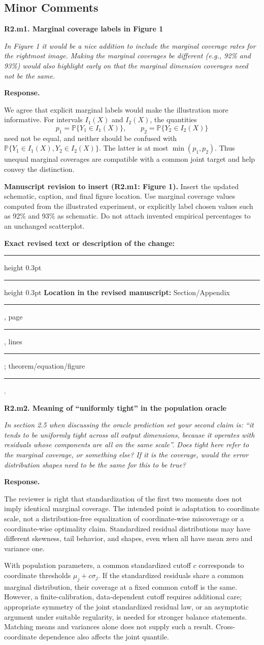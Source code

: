 \documentclass[11pt]{article}
\numberwithin{equation}{section}
\newcommand{\Prob}{\mathbb{P}}
\newcommand{\reviewercomment}[2]{%
  \par\medskip\noindent\textbf{#1}\par\nopagebreak
  \begingroup\color{ReviewerBlue}\itshape #2\par\endgroup
  \noindent\textbf{Response.} }
\newcommand{\revisionblock}[2]{%
  \par\begingroup\color{AuthorRed}\small
  \textbf{Manuscript revision to insert (#1).} #2\par
  \textbf{Exact revised text or description of the change:}\par
  \vspace{0.35em}\hrule height 0.3pt\vspace{1.4em}
  \hrule height 0.3pt\vspace{0.6em}
  \textbf{Location in the revised manuscript:}
  Section/Appendix \rule{1.3cm}{0.3pt},
  page \rule{1cm}{0.3pt},
  lines \rule{1.3cm}{0.3pt};
  theorem/equation/figure \rule{1.4cm}{0.3pt}.
  \par\endgroup}
\begin{document}
\subsection{Minor Comments}

\reviewercomment{R2.m1. Marginal coverage labels in Figure 1}{%
In Figure 1 it would be a nice addition to include the marginal
coverage rates for the rightmost image. Making the marginal
coverages be different (e.g., 92\% and 93\%) would also highlight
early on that the marginal dimension coverages need not be the same.}

We agree that explicit marginal labels would make the illustration
more informative. For intervals $I_1(X)$ and $I_2(X)$, the quantities
\[
 p_1=\Prob\{Y_1\in I_1(X)\},\qquad
 p_2=\Prob\{Y_2\in I_2(X)\}
\]
need not be equal, and neither should be confused with
$\Prob\{Y_1\in I_1(X),Y_2\in I_2(X)\}$. The latter is at most
$\min(p_1,p_2)$. Thus unequal marginal coverages are compatible
with a common joint target and help convey the distinction.

\revisionblock{R2.m1: Figure 1}{Insert the updated schematic,
caption, and final figure location. Use marginal coverage values
computed from the illustrated experiment, or explicitly label
chosen values such as 92\% and 93\% as schematic. Do not attach
invented empirical percentages to an unchanged scatterplot.}

\reviewercomment{R2.m2. Meaning of ``uniformly tight'' in the population oracle}{%
In section 2.5 when discussing the oracle prediction set your
second claim is: ``it tends to be uniformly tight across all
output dimensions, because it operates with residuals whose
components are all on the same scale''. Does tight here refer
to the marginal coverage, or something else? If it is the
coverage, would the error distribution shapes need to be the
same for this to be true?}

The reviewer is right that standardization of the first two moments
does not imply identical marginal coverage. The intended point is
adaptation to coordinate scale, not a distribution-free equalization
of coordinate-wise miscoverage or a coordinate-wise optimality
claim. Standardized residual distributions may have different
skewness, tail behavior, and shapes, even when all have mean zero
and variance one.

With population parameters, a common standardized cutoff $c$
corresponds to coordinate thresholds $\mu_j+c\sigma_j$. If the
standardized residuals share a common marginal distribution, their
coverage at a fixed common cutoff is the same. However, a
finite-calibration, data-dependent cutoff requires additional care;
appropriate symmetry of the joint standardized residual law, or
an asymptotic argument under suitable regularity, is needed for
stronger balance statements. Matching means and variances alone
does not supply such a result. Cross-coordinate dependence also
affects the joint quantile.
\end{document}

